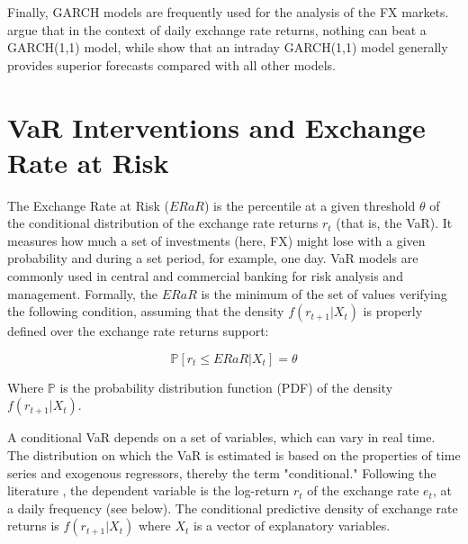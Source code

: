\documentclass[11pt]{article}
\newcommand{\source}[1]{\caption*{\raggedright \small {#1} \normalsize}} %
\begin{document}
Finally,  GARCH  models  are  frequently  used for  the  analysis  of  the  FX
markets. \cite{hansen2005}  argue that in  the context of daily  exchange rate
returns, nothing can  beat a GARCH(1,1) model,  while \cite{mcmillan2012} show
that  an  intraday  GARCH(1,1)  model generally  provides  superior  forecasts
compared with all other models.\\

\section{VaR Interventions and Exchange Rate at Risk}
\label{sec:var-interventions}

The Exchange  Rate at  Risk ($ERaR$)  is the percentile  at a  given threshold
$\theta$ of  the conditional distribution  of the exchange rate  returns $r_t$
(that is, the VaR). It measures how much a set of investments (here, FX) might
lose  with a  given probability  and  during a  set period,  for example,  one
day. VaR models  are commonly used in central and  commercial banking for risk
analysis and  management.  Formally, the $ERaR$  is the minimum of  the set of
values verifying the following condition, assuming that the density $f(r_{t+1}
| X_t)$ is properly defined over the exchange rate returns support:

\begin{equation*}
  \mathbb{P}\left[r_t \leq ERaR | X_t \right] = \theta
\end{equation*}

Where  $\mathbb{P}$ is  the  probability distribution  function  (PDF) of  the
density $f(r_{t+1}|X_t)$.



A conditional VaR depends on a set  of variables, which can vary in real time.
The distribution on which  the VaR is estimated is based  on the properties of
time  series  and  exogenous   regressors,  thereby  the  term  "conditional."
Following  the literature  \citep{sarno2003},  the dependent  variable is  the
log-return $r_t$ of the exchange rate $e_t$, at a daily frequency (see below).
The   conditional   predictive   density   of   exchange   rate   returns   is
$f(r_{t+1}|X_t)$ where $X_t$ is a vector of explanatory variables.
\end{document}

